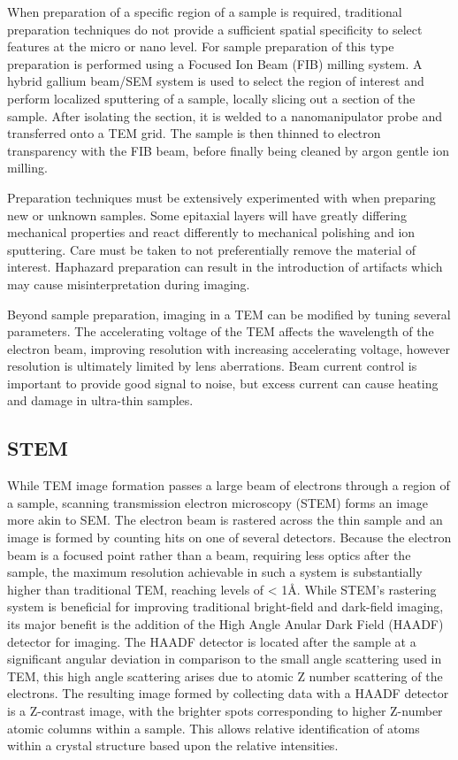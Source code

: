 When preparation of a specific region of a sample is required, traditional preparation techniques do not provide a sufficient spatial specificity to select features at the micro or nano level.
For sample preparation of this type preparation is performed using a Focused Ion Beam (FIB) milling system.
A hybrid gallium beam/SEM system is used to select the region of interest and perform localized sputtering of a sample, locally slicing out a section of the sample.
After isolating the section, it is welded to a nanomanipulator probe and transferred onto a TEM grid.
The sample is then thinned to electron transparency with the FIB beam, before finally being cleaned by argon gentle ion milling.

Preparation techniques must be extensively experimented with when preparing new or unknown samples.
Some epitaxial layers will have greatly differing mechanical properties and react differently to mechanical polishing and ion sputtering.
Care must be taken to not preferentially remove the material of interest.
Haphazard preparation can result in the introduction of artifacts which may cause misinterpretation during imaging.

Beyond sample preparation, imaging in a TEM can be modified by tuning several parameters.
The accelerating voltage of the TEM affects the wavelength of the electron beam, improving resolution with increasing accelerating voltage, however resolution is ultimately limited by lens aberrations.
Beam current control is important to provide good signal to noise, but excess current can cause heating and damage in ultra-thin samples.

\subsection{STEM} While TEM image formation passes a large beam of electrons through a region of a sample, scanning transmission electron microscopy (STEM) forms an image more akin to SEM. The electron beam is rastered across the thin sample and an image is formed by counting hits on one of several detectors.
Because the electron beam is a focused point rather than a beam, requiring less optics after the sample, the maximum resolution achievable in such a system is substantially higher than traditional TEM, reaching levels of < 1\AA{}.
While STEM's rastering system is beneficial for improving traditional bright-field and dark-field imaging, its major benefit is the addition of the High Angle Anular Dark Field (HAADF) detector for imaging.
The HAADF detector is located after the sample at a significant angular deviation in comparison to the small angle scattering used in TEM, this high angle scattering arises due to atomic Z number scattering of the electrons.
The resulting image formed by collecting data with a HAADF detector is a Z-contrast image, with the brighter spots corresponding to higher Z-number atomic columns within a sample.
This allows relative identification of atoms within a crystal structure based upon the relative intensities.

